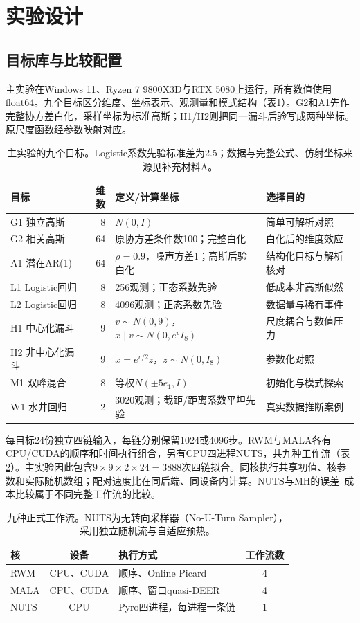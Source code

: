 \documentclass[UTF8,fontset=fandol,zihao=-4]{ctexart}
\begin{document}
\section{实验设计}
\subsection{目标库与比较配置}
主实验在Windows 11、Ryzen 7 9800X3D与RTX 5080上运行，所有数值使用float64。九个目标区分维度、坐标表示、观测量和模式结构（表\ref{tab:targets}）。G2和A1先作完整协方差白化，采样坐标为标准高斯；H1/H2则把同一漏斗后验写成两种坐标。原尺度函数经参数映射对应。
\begin{table}[htbp]\centering\small
\begin{tabular}{p{.24\linewidth}rp{.30\linewidth}p{.29\linewidth}}\toprule
目标 & 维数 & 定义/计算坐标 & 选择目的\\\midrule
G1 独立高斯 & 8 & $N(0,I)$ & 简单可解析对照\\
G2 相关高斯 & 64 & 原协方差条件数100；完整白化 & 白化后的维度效应\\
A1 潜在AR(1) & 64 & $\rho=0.9$，噪声方差1；高斯后验白化 & 结构化目标与解析核对\\
L1 Logistic回归 & 8 & 256观测；正态系数先验 & 低成本非高斯似然\\
L2 Logistic回归 & 8 & 4096观测；正态系数先验 & 数据量与稀有事件\\
H1 中心化漏斗 & 9 & $v\sim N(0,9)$，$x\mid v\sim N(0,e^vI_8)$ & 尺度耦合与数值压力\\
H2 非中心化漏斗 & 9 & $x=e^{v/2}z$，$z\sim N(0,I_8)$ & 参数化对照\\
M1 双峰混合 & 8 & 等权$N(\pm5e_1,I)$ & 初始化与模式探索\\
W1 水井回归 & 2 & 3020观测；截距/距离系数平坦先验 & 真实数据推断案例\\\bottomrule
\end{tabular}
\caption{主实验的九个目标。Logistic系数先验标准差为2.5；数据与完整公式、仿射坐标来源见补充材料A。}\label{tab:targets}
\end{table}

每目标24份独立四链输入，每链分别保留1024或4096步。RWM与MALA各有CPU/CUDA的顺序和时间执行组合，另有CPU四进程NUTS，共九种工作流（表\ref{tab:workflows}）。主实验因此包含$9\times9\times2\times24=3888$次四链拟合。同核执行共享初值、核参数和实际随机数组；配对速度比在同后端、同设备内计算。NUTS与MH的误差--成本比较属于不同完整工作流的比较。
\begin{table}[htbp]\centering\small
\begin{tabular}{lclc}\toprule
核 & 设备 & 执行方式 & 工作流数\\\midrule
RWM & CPU、CUDA & 顺序、Online Picard & 4\\
MALA & CPU、CUDA & 顺序、窗口quasi-DEER & 4\\
NUTS & CPU & Pyro四进程，每进程一条链 & 1\\\bottomrule
\end{tabular}
\caption{九种正式工作流。NUTS为无转向采样器（No-U-Turn Sampler），采用独立随机流与自适应预热。}\label{tab:workflows}
\end{table}
\end{document}

